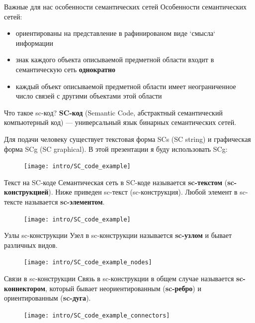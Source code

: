 \begin{frame}{Важные для нас особенности семантических сетей}
  Особенности семантических сетей:
  \begin{itemize}
  \item ориентированы на представление в рафинированом виде `смысла`
    информации
  \item знак каждого объекта описываемой предметной области входит в
    семантическую сеть \textbf{однократно}
  \item каждый объект описываемой предметной области имеет
    неограниченное число связей с другими объектами этой области
  \end{itemize}
\end{frame}


\begin{frame}[shrink=10]{Что такое sc-код?}
  \textbf{SC-код} (Semantic Code, абстрактный семантический
  компьютерный код) — универсальный язык бинарных семантических сетей.
  
  Для подачи человеку существует текстовая форма SCs (SC string) и
  графическая форма SCg (SC graphical). В этой презентации я буду
  использовать SCg:
  \begin{figure}
    \centering
    \texttt{[image: intro/SC\_code\_example]}
  \end{figure}
\end{frame}

\begin{frame}[shrink=5]{Текст на SC-коде}
  Семантическая сеть в SC-коде называется \textbf{sc-текстом}
  (\textbf{sc-конструкцией}).  Ниже приведен sc-текст
  (sc-конструкция). Любой элемент в sc-тексте называется
  \textbf{sc-элементом}.
  \begin{figure}
    \centering
    \texttt{[image: intro/SC\_code\_example]}
  \end{figure}
\end{frame}

\begin{frame}{Узлы sc-конструкции}
  Узел в sc-конструкции называется \textbf{sc-узлом} и бывает
  различных видов.
  \begin{figure}
    \centering
    \texttt{[image: intro/SC\_code\_example\_nodes]}
  \end{figure}
\end{frame}

\begin{frame}[shrink=5]{Связи в sc-конструкции}
  Связь в sc-конструкции в общем случае называется \textbf{sc-коннектором},
  который бывает неориентированным (\textbf{sc-ребро}) и ориентированным
  (\textbf{sc-дуга}).
  \begin{figure}
    \centering
    \texttt{[image: intro/SC\_code\_example\_connectors]}
  \end{figure}
\end{frame}

